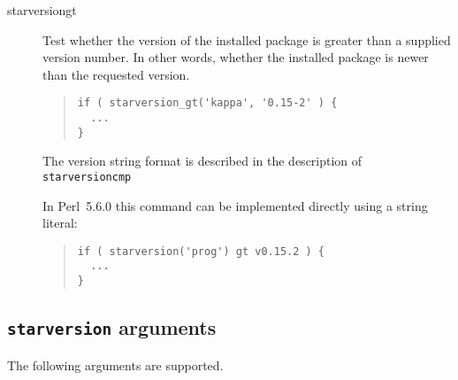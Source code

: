 \documentclass[twoside,11pt]{article}
\newenvironment{myquote}{\begin{quote}\begin{small}}{\end{small}\end{quote}}
\newcommand{\perl}{\xref{\textsf{Perl}}{sun193}{}}
\newcommand{\xref}[3]{#1}
\renewcommand{\_}{\texttt{\symbol{95}}}
\begin{document}
\begin{description}
\item[starversion\_gt] \mbox{}

Test whether the version of the installed package is greater than 
a supplied version number. In other words, whether the installed
package is newer than the requested version.

\begin{myquote}
\begin{verbatim}
if ( starversion_gt('kappa', '0.15-2' ) {
  ...
}
\end{verbatim}
\end{myquote}

The version string format is described in the description of
\texttt{starversion\_cmp}



In \perl\ 5.6.0 this command can be implemented directly using a 
string literal:

\begin{myquote}
\begin{verbatim}
if ( starversion('prog') gt v0.15.2 ) {
  ...
}
\end{verbatim}
\end{myquote}

\end{description}

\subsection{\texttt{starversion} arguments\label{starversion}}

The following arguments are supported.
\end{document}
